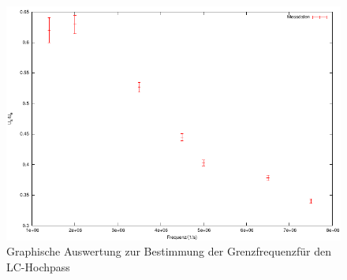 \documentclass[12pt]{scrartcl}
\begin{document}
\begin{figure}[htbp] 
  \centering
    \includegraphics[scale = 1]{teil_6.pdf}
  	\caption[Graphische Auswertung zur Bestimmung der Grenzfrequenz für den LC-Hochpass]{Graphische Auswertung zur Bestimmung der Grenzfrequenzfür den LC-Hochpass}
  \label{fig:teil_6}
\end{figure}
\end{document}
